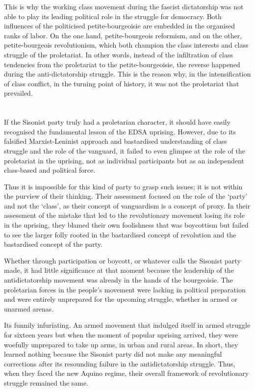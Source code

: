 This is why the working class movement during the fascist dictatorship 
was not able to play its leading political role in the struggle for democracy. 
Both influences of the politicised petite-bourgeoisie 
are embedded in the organised ranks of labor. 
On the one hand, petite-bourgeois reformism, 
and on the other, petite-bourgeois revolutionism, 
which both champion the class interests and class struggle of the proletariat. 
In other words, instead of the infiltration of class tendencies 
from the proletariat to the petite-bourgeoisie, 
the reverse happened during the anti-dictatorship struggle.
This is the reason why, 
in the intensification of class conflict, 
in the turning point of history, 
it was not the proletariat that prevailed.

\section{}
If the Sisonist party truly had a proletarian character, 
it should have easily recognised the fundamental lesson of the EDSA uprising. 
However, due to its falsified Marxist-Leninist approach 
and bastardised understanding of class struggle and the role of the vanguard, 
it failed to even glimpse 
at the role of the proletariat in the uprising, 
not as individual participants 
but as an independent class-based and political force.

Thus 
it is impossible for this kind of party 
to grasp such issues;
it is not within the purview of their thinking. 
Their assessment focused 
on the role of the `party' and not the `class', 
as their concept of vanguardism is a concept of proxy. 
In their assessment of the mistake that led 
to the revolutionary movement losing its role in the uprising, 
they blamed their own foolishness that was boycottism 
but failed to see the larger folly 
rooted in the bastardised concept of revolution 
and the bastardised concept of the party.

Whether through participation or boycott, 
or whatever calls the Sisonist party made, 
it had little significance at that moment 
because the leadership of the antidictatorship movement 
was already in the hands of the bourgeoisie. 
The proletarian forces in the people's movement 
were lacking in political preparation 
and were entirely unprepared for the upcoming struggle, 
whether in armed or unarmed arenas.

Its funnily infuriating. 
An armed movement that indulged itself 
in armed struggle for sixteen years 
but when the moment of popular uprising arrived, 
they were woefully unprepared to take up arms, 
in urban and rural areas. 
In short, 
they learned nothing 
because the Sisonist party did not make any meaningful corrections 
after its resounding failure in the antidictatorship struggle. 
Thus, when they faced the new Aquino regime, 
their overall framework of revolutionary struggle remained the same.

